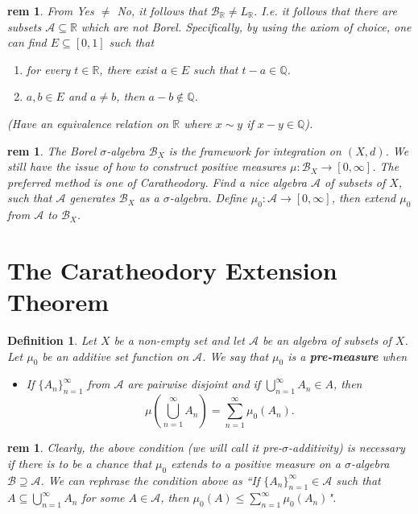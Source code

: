 \documentclass[letterpaper, 12pt]{article}
\newcommand{\fin}{\qquad \quad \hfill \framebox[1.75mm][l]{\,}}
\newcommand{\cB}{\mathcal{B}}
\newcommand{\bR}{\mathbb{R}}
\newcommand{\bQ}{\mathbb{Q}}
\newcommand{\sA}{\mathcal{A}}
\theoremstyle{stdthm}
\theoremstyle{stddef}
\newtheorem{defn}[thm]{Definition}
\newtheorem{rem}[thm]{rem} %
\theoremstyle{stdnonum}
\theoremstyle{stdqands}
\theoremstyle{stdbold}
\begin{document}
\begin{rem}
From Yes $\neq$ No, it follows that $\cB_\bR \neq L_\bR$. I.e. it follows that there are subsets $\sA \subseteq \bR$ which are not Borel. Specifically, by using the axiom of choice, one can find $E\subseteq [0,1]$ such that 
\begin{enumerate}
\item for every $t\in \bR$, there exist $a\in E$ such that $t-a \in \bQ$.
\item $a,b \in E$ and $a\neq b$, then $a-b \notin \bQ$.
\end{enumerate}
(Have an equivalence relation on $\bR$ where $x \sim y$ if $x-y \in \bQ$). 
\end{rem}

\begin{rem}
The Borel $\sigma$-algebra $\cB_X$ is the framework for integration on $(X,d)$. We still have the issue of how to construct positive measures $\mu: \cB_X \rightarrow [0,\infty]$. The preferred method is one of Caratheodory. Find a nice algebra $\sA$ of subsets of $X$, such that $\sA$ generates $\cB_X$ as a $\sigma$-algebra. Define $\mu_0: \sA \rightarrow [0,\infty]$, then extend $\mu_0$ from $\sA$ to $\cB_X$. 
\end{rem}

\newpage

\section{The Caratheodory Extension Theorem}

\begin{defn}
Let $X$ be a non-empty set and let $\sA$ be an algebra of subsets of $X$. Let $\mu_0$ be an additive set function on $\sA$. We say that $\mu_0$ is a {\bf pre-measure} when 
\begin{itemize}
\item If $\{A_n\}_{n=1}^\infty$ from $\sA$ are pairwise disjoint and if $\bigcup_{n=1}^\infty A_n \in A$, then \[\mu\left(\bigcup_{n=1}^\infty A_n\right) = \sum_{n=1}^\infty \mu_0(A_n).\]
\end{itemize}
\end{defn}

\begin{rem}
Clearly, the above condition (we will call it pre-$\sigma$-additivity) is necessary if there is to be a chance that $\mu_0$ extends to a positive measure on a $\sigma$-algebra $\cB \supseteq \sA$. We can rephrase the condition above as ``If $\{A_n\}_{n=1}^\infty \in \sA$ such that $A \subseteq \bigcup_{n=1}^\infty A_n$ for some $A\in\sA$, then $\mu_0(A) \leq \sum_{n=1}^\infty \mu_0(A_n)$".    
\end{rem}
\end{document}
